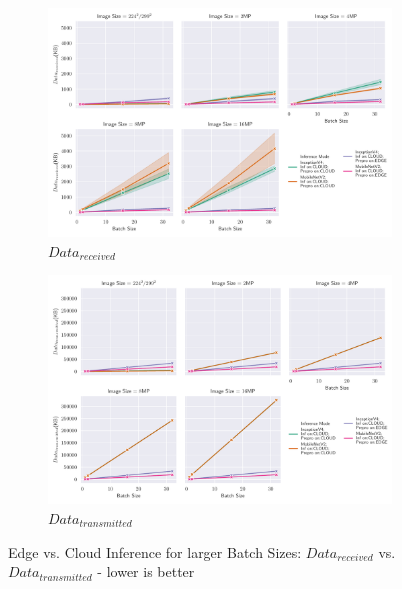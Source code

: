\begin{figure}[!htb]
\centering
\begin{subfigure}[b]{0.95\textwidth}
   \includegraphics[width=1\linewidth]{./Bilder/single_plots/batch_size_plots/Effects_of_Batch_size_Received_Data.pdf}
   \caption{$Data_{received}$}
   \label{fig:BatchSizeReceivedData} 
\end{subfigure}

\begin{subfigure}[b]{0.95\textwidth}
   \includegraphics[width=1\linewidth]{./Bilder/single_plots/batch_size_plots/Effects_of_Batch_size_Transmitted_Data.pdf}
   \caption{$Data_{transmitted}$}
   \label{fig:BatchSizeTransmittedData}
\end{subfigure}

\caption{Edge vs.  Cloud Inference for larger Batch Sizes:  $Data_{received}$ vs. $Data_{transmitted}$ - lower is better}
\end{figure}



